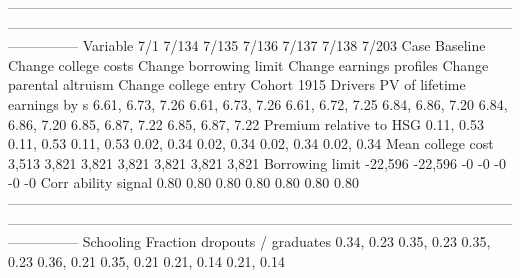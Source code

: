 ---------------------------------------------------------------------------------------------------------------------------------------------------------------------------------------------------------------------------------------
                              Variable                          7/1                        7/134                    7/135                     7/136                       7/137                       7/138                       7/203
                                  Case                     Baseline         Change college costs   Change borrowing limit  Change earnings profiles    Change parental altruism        Change college entry                 Cohort 1915
                               Drivers                                                                                                                                                                                                 
          PV of lifetime earnings by s             6.61, 6.73, 7.26             6.61, 6.73, 7.26         6.61, 6.72, 7.25          6.84, 6.86, 7.20            6.84, 6.86, 7.20            6.85, 6.87, 7.22            6.85, 6.87, 7.22
               Premium relative to HSG                   0.11, 0.53                   0.11, 0.53               0.11, 0.53                0.02, 0.34                  0.02, 0.34                  0.02, 0.34                  0.02, 0.34
                     Mean college cost                        3,513                        3,821                    3,821                     3,821                       3,821                       3,821                       3,821
                       Borrowing limit                      -22,596                      -22,596                       -0                        -0                          -0                          -0                          -0
                   Corr ability signal                         0.80                         0.80                     0.80                      0.80                        0.80                        0.80                        0.80
---------------------------------------------------------------------------------------------------------------------------------------------------------------------------------------------------------------------------------------
                             Schooling                                                                                                                                                                                                 
         Fraction dropouts / graduates                   0.34, 0.23                   0.35, 0.23               0.35, 0.23                0.36, 0.21                  0.35, 0.21                  0.21, 0.14                  0.21, 0.14
